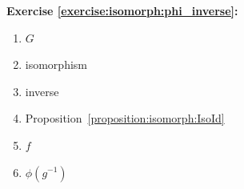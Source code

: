 \noindent\textbf{Exercise \ref{exercise:isomorph:phi_inverse}:}
%

\begin{multicols}{3}
\begin{enumerate}
\item
$G$

\item
isomorphism

\item
inverse

\item
Proposition~\ref{proposition:isomorph:IsoId}

\item
$f$

\item
$\phi(g^{-1})$
\end{enumerate}
\end{multicols}

